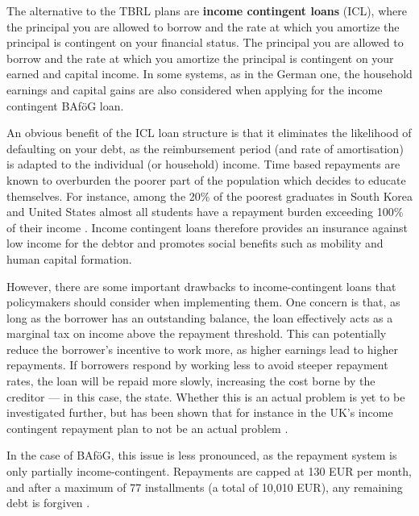The alternative to the TBRL plans are \textbf{income contingent loans} (ICL), where the 
principal you are allowed to borrow and the rate at which you amortize the principal is contingent on your financial status. The principal you are allowed to borrow and the 
rate at which you amortize the principal is contingent on your earned 
and capital income. In some systems, as in the German one, the household earnings 
and capital gains are also considered when applying for the income contingent BAföG loan.

An obvious benefit of the ICL loan structure is that it eliminates the likelihood 
of defaulting on your debt, as the reimbursement period 
(and rate of amortisation) is adapted to the individual (or household) income. 
Time based repayments are known to overburden the poorer part of the population which decides to 
educate themselves. For instance, among the 20\% of the poorest graduates in South Korea and United States 
almost all students have a repayment burden exceeding 100\% of their income 
\citep{chapman_income-contingent_2022}. 
Income contingent loans therefore provides an insurance against low income for the debtor and promotes social benefits such as mobility and human capital formation.

However, there are some important drawbacks to income-contingent loans that policymakers should consider when implementing them. 
One concern is that, as long as the borrower has an outstanding balance, the loan effectively acts as a marginal tax on income above the repayment threshold. 
This can potentially reduce the borrower’s incentive to work more, as higher earnings lead to higher repayments. 
If borrowers respond by working less to avoid steeper repayment rates, the loan will be repaid more slowly, increasing the cost borne by the creditor — in this case, the state.
Whether this is an actual problem is yet to be investigated further, but has been
shown that for instance in the UK's income contingent repayment plan to not 
be an actual problem \citep{britton_income_2020}. 

In the case of BAföG, this issue is less pronounced, as the repayment system is only partially income-contingent. Repayments are capped at 130 EUR per month, and after a maximum of 77 installments (a total of 10,010 EUR), any remaining debt is forgiven \citep{studentenwerk_bafog}.







